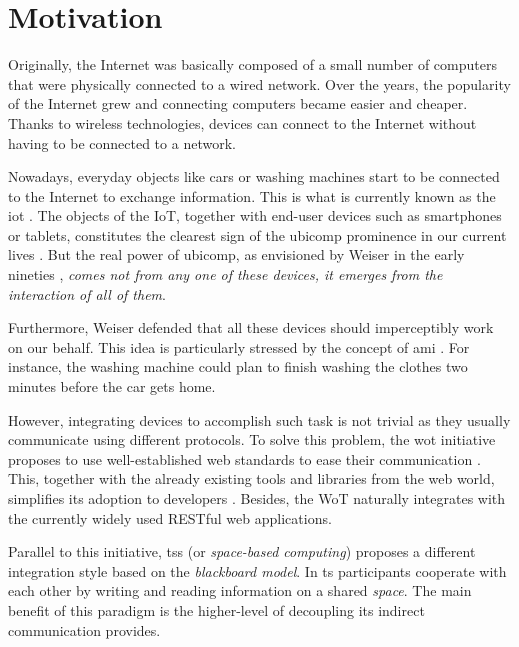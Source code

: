 \section{Motivation}
\label{sec:Motivation}

Originally, the Internet was basically composed of a small number of computers that were physically connected to a wired network.
Over the years, the popularity of the Internet grew and connecting computers became easier and cheaper.
Thanks to wireless technologies, devices can connect to the Internet without having to be connected to a network.

Nowadays, everyday objects like cars or washing machines start to be connected to the Internet to exchange information.
This is what is currently known as the \ac{iot} \citep{atzori_internet_2010}.
The objects of the IoT, together with end-user devices such as smartphones or tablets, constitutes the clearest sign of the \ac{ubicomp} prominence in our current lives \citep{caceres_ubicomp_2012}.
But the real power of \ac{ubicomp}, as envisioned by Weiser in the early nineties \citep{weiser1991computer}, \emph{comes not from any one of these devices, it emerges from the interaction of all of them}.

Furthermore, Weiser defended that all these devices should imperceptibly work on our behalf.
This idea is particularly stressed by the concept of \ac{ami} \citep{ramos_ambient_2008}.
For instance, the washing machine could plan to finish washing the clothes two minutes before the car gets home.

\medskip

However, integrating devices to accomplish such task is not trivial as they usually communicate using different protocols.
To solve this problem, the \ac{wot} initiative proposes to use well-established web standards to ease their communication \citep{guinard_thesis_2011}.
This, together with the already existing tools and libraries from the web world, simplifies its adoption to developers \citep{guinard_search_2011}.
Besides, the WoT naturally integrates with the currently widely used RESTful web applications.

Parallel to this initiative, \aclp{ts} (or \emph{space-based computing}) \citep{gelernter_generative_1985} proposes a different integration style based on the \emph{blackboard model}.
In \ac{ts} participants cooperate with each other by writing and reading information on a shared \emph{space}.
The main benefit of this paradigm is the higher-level of decoupling its indirect communication provides. %

